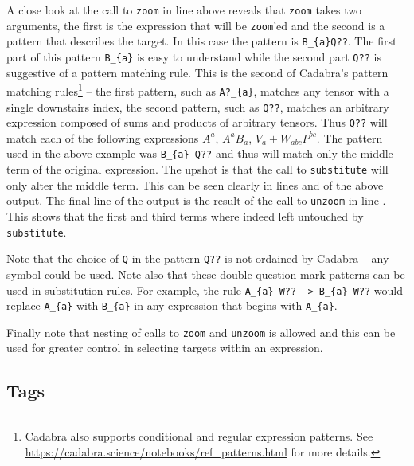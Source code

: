 \documentclass[a4paper,12pt]{article}
\numberwithin{equation}{section}%
\begin{document}
A close look at the call to \verb|zoom| in line  above reveals that
\verb|zoom| takes two arguments, the first is the expression that will be \verb|zoom|'ed and
the second is a pattern that describes the target. In this case the pattern is
\verb|B_{a}Q??|. The first part of this pattern \verb|B_{a}| is easy to understand while the
second part \verb|Q??| is suggestive of a pattern matching rule. This is the second of
Cadabra's pattern matching rules\footnote{Cadabra also supports conditional and regular
expression patterns. See \url{https://cadabra.science/notebooks/ref_patterns.html} for more
details.} -- the first pattern, such as \verb|A?_{a}|, matches any tensor with a single
downstairs index, the second pattern, such as \verb|Q??|, matches an arbitrary expression
composed of sums and products of arbitrary tensors. Thus \verb|Q??| will match each of the
following expressions $A^{a}$, $A^{a} B_{a}$, $V_{a} + W_{a b c} P^{b c}$. The pattern used
in the above example was \verb|B_{a} Q??| and thus will match only the middle term of the
original expression. The upshot is that the call to \verb|substitute| will only alter the
middle term. This can be seen clearly in lines  and  of
the above output. The final line of the output is the result of the call to \verb|unzoom| in
line . This shows that the first and third terms where indeed left
untouched by \verb|substitute|.

Note that the choice of \verb|Q| in the pattern \verb|Q??| is not ordained by Cadabra -- any
symbol could be used. Note also that these double question mark patterns can be used in
substitution rules. For example, the rule \verb|A_{a} W?? -> B_{a} W??| would replace
\verb|A_{a}| with \verb|B_{a}| in any expression that begins with \verb|A_{a}|.

Finally note that nesting of calls to \verb|zoom| and \verb|unzoom| is allowed and this can
be used for greater control in selecting targets within an expression.

\subsection{Tags}
\end{document}

